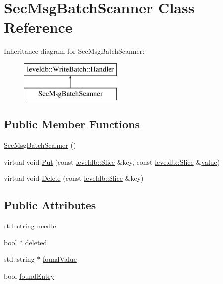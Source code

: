 \hypertarget{class_sec_msg_batch_scanner}{}\section{Sec\+Msg\+Batch\+Scanner Class Reference}
\label{class_sec_msg_batch_scanner}
Inheritance diagram for Sec\+Msg\+Batch\+Scanner\+:\begin{figure}[H]
\begin{center}
\leavevmode
\includegraphics[height=2.000000cm]{class_sec_msg_batch_scanner}
\end{center}
\end{figure}
\subsection*{Public Member Functions}
\begin{DoxyCompactItemize}
\item 
\hyperlink{class_sec_msg_batch_scanner_a34442f9306b1d848def23e4a08a29c0b}{Sec\+Msg\+Batch\+Scanner} ()
\item 
virtual void \hyperlink{class_sec_msg_batch_scanner_ad43a3dd99b44578696b0582c4e08f158}{Put} (const \hyperlink{classleveldb_1_1_slice}{leveldb\+::\+Slice} \&key, const \hyperlink{classleveldb_1_1_slice}{leveldb\+::\+Slice} \&\hyperlink{cache_8cc_a0f61d63b009d0880a89c843bd50d8d76}{value})
\item 
virtual void \hyperlink{class_sec_msg_batch_scanner_a353fc7e6d79d762092646f00c7dc0f60}{Delete} (const \hyperlink{classleveldb_1_1_slice}{leveldb\+::\+Slice} \&key)
\end{DoxyCompactItemize}
\subsection*{Public Attributes}
\begin{DoxyCompactItemize}
\item 
std\+::string \hyperlink{class_sec_msg_batch_scanner_a15f820824b8c5f64a3fba97b9133a50e}{needle}
\item 
bool $\ast$ \hyperlink{class_sec_msg_batch_scanner_a184ca3c1ae1f48ab994852af4b6b741e}{deleted}
\item 
std\+::string $\ast$ \hyperlink{class_sec_msg_batch_scanner_a1f9a62489af577112cbe0db50e155e58}{found\+Value}
\item 
bool \hyperlink{class_sec_msg_batch_scanner_a1842d0e149b314a7beb82cc4840f5565}{found\+Entry}
\end{DoxyCompactItemize}


